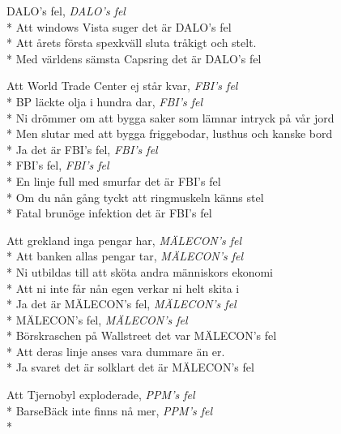 \begin{SongText}
\begin{SongVerse}
        DALO's fel, \textit{DALO's fel}\\*%
        Att windows Vista suger det är DALO's fel\\*%
        Att årets första spexkväll sluta tråkigt och stelt.\\*%
        Med världens sämsta Capsring det är DALO's fel
    \end{SongVerse}
    \begin{SongVerse}
        Att World Trade Center ej står kvar, \textit{FBI's fel}\\*%
        BP läckte olja i hundra dar, \textit{FBI's fel}\\*%
        Ni drömmer om att bygga saker som lämnar intryck på vår jord\\*%
        Men slutar med att bygga friggebodar, lusthus och kanske bord\\*%
        Ja det är FBI's fel, \textit{FBI's fel}\\*%
        FBI's fel, \textit{FBI's fel}\\*%
        En linje full med smurfar det är FBI's fel\\*%
        Om du nån gång tyckt att ringmuskeln känns stel\\*%
        Fatal brunöge infektion det är FBI's fel
    \end{SongVerse}
    \begin{SongVerse}
        Att grekland inga pengar har, \textit{MÄLECON's fel}\\*%
        Att banken allas pengar tar, \textit{MÄLECON's fel}\\*%
        Ni utbildas till att sköta andra människors ekonomi\\*%
        Att ni inte får nån egen verkar ni helt skita i\\*%
        Ja det är MÄLECON's fel, \textit{MÄLECON's fel}\\*%
        MÄLECON's fel, \textit{MÄLECON's fel}\\*%
        Börskraschen på Wallstreet det var MÄLECON's fel\\*%
        Att deras linje anses vara dummare än er.\\*%
        Ja svaret det är solklart det är MÄLECON's fel
    \end{SongVerse}
    \begin{SongVerse}
        Att Tjernobyl exploderade, \textit{PPM's fel}\\*%
        BarseBäck inte finns nå mer, \textit{PPM's fel}\\*%

\end{SongVerse}
\end{SongText}
